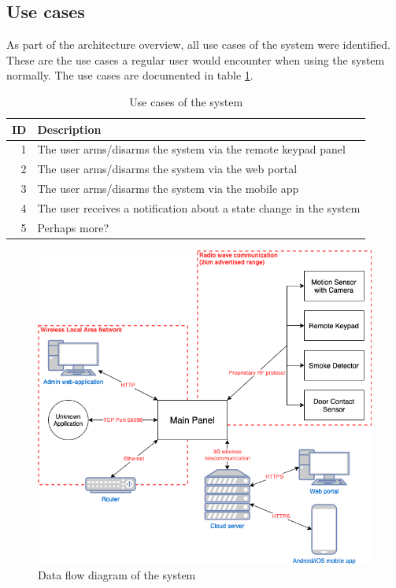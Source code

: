 \subsection{Use cases}
As part of the architecture overview, all use cases of the system were identified. These are the use cases a regular user would encounter when using the system normally. The use cases are documented in table \ref{tb:use-cases}.
\begin{table}[!ht]
    \centering
    \begin{tabularx}{\textwidth}{r X}
        \hline
        \textbf{ID} & \textbf{Description}
        \\ \hline
        1  & The user arms/disarms the system via the remote keypad panel
        \\
        2  & The user arms/disarms the system via the web portal
        \\
        3  & The user arms/disarms the system via the mobile app
        \\
        4  & The user receives a notification about a state change in the system
        \\
        5  & Perhaps more?
        \\ \hline
    \end{tabularx}
    \caption{Use cases of the system}
    \label{tb:use-cases}
\end{table}

\begin{figure}[!ht]
    \centering
    \includegraphics[width=\textwidth]{images/system-overview.png}
    \caption{Data flow diagram of the system}
    \label{fig:system-overview}
\end{figure}

